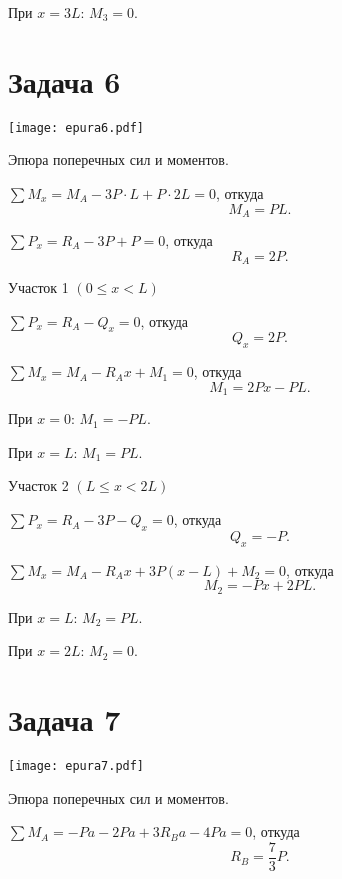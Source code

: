 При $x = 3L$: $M_3 = 0$.

\newpage


\section{Задача 6}

\begin{floatingfigure}[r]{0.5\textwidth}
    \centering
    \texttt{[image: epura6.pdf]}
    \caption{Эпюра поперечных сил и моментов.}
    \label{fig:chap1-epura6}
\end{floatingfigure}

$\sum M_x = M_A - 3P \cdot L + P \cdot 2L = 0$,
откуда
\[
    M_A = PL.
\]

$\sum P_x = R_A - 3P + P = 0$,
откуда
\[
    R_A = 2P.
\]

\vspace{1.5ex}

Участок 1 $\left(0 \le x < L\right)$

$\sum P_x = R_A - Q_x = 0$,
откуда
\[
    Q_x = 2P.
\]

$\sum M_x = M_A - R_A x + M_1 = 0$,
откуда
\[
    M_1 = 2Px - PL.
\]

При $x = 0$: $M_1 = -PL$.

При $x = L$: $M_1 = PL$.

\vspace{1.5ex}

Участок 2 $ \left(L \le x < 2L\right)$

$\sum P_x = R_A - 3P - Q_x = 0$,
откуда
\[
    Q_x = -P.
\]

$ \sum M_x = M_A - R_A x + 3P (x-L) + M_2 = 0 $,
откуда
\[
    M_2 = -Px + 2PL.
\]

При $x = L$: $M_2 = PL$.

При $x = 2L$: $M_2 = 0$.

\newpage


\section{Задача 7}

\begin{floatingfigure}[r]{0.5\textwidth}
    \centering
    \texttt{[image: epura7.pdf]}
    \caption{Эпюра поперечных сил и моментов.}
    \label{fig:chap1-epura7}
\end{floatingfigure}

$\sum M_A = -Pa - 2 P a + 3 R_B a - 4 P a = 0$,
откуда
\[
    R_B = \frac{7}{3}P.
\]

